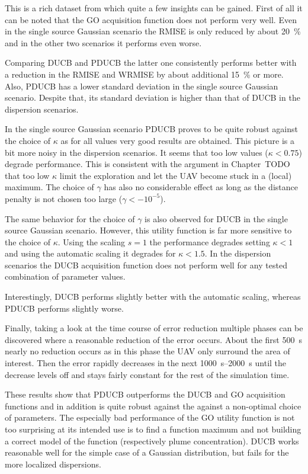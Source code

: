 \documentclass[11pt,a4paper,twoside,BCOR=15mm]{scrreprt}
\begin{document}
This is a rich dataset from which quite a few insights can be gained. First of 
all it can be noted that the GO acquisition function does not perform very well.  
Even in the single source Gaussian scenario the RMISE is only reduced by about 
\SI{20}{\percent} and in the other two scenarios it performs even worse.

Comparing DUCB and PDUCB the latter one consistently performs better with 
a reduction in the RMISE and WRMISE by about additional \SI{15}{\percent} or 
more. Also, PDUCB has a lower standard deviation in the single source Gaussian 
scenario. Despite that, its standard deviation is higher than that of DUCB in 
the dispersion scenarios.

In the single source Gaussian scenario PDUCB proves to be quite robust against 
the choice of $\kappa$ as for all values very good results are obtained. This 
picture is a bit more noisy in the dispersion scenarios. It seems that too low 
values ($\kappa < 0.75$) degrade performance. This is consistent with the 
argument in Chapter~TODO that too low $\kappa$ limit the exploration and let the 
UAV become stuck in a (local) maximum. The choice of $\gamma$ has also no 
considerable effect as long as the distance penalty is not chosen too large 
($\gamma < -10^{-5}$).

The same behavior for the choice of $\gamma$ is also observed for DUCB in the 
single source Gaussian scenario. However, this utility function is far more 
sensitive to the choice of $\kappa$. Using the scaling $s = 1$ the performance 
degrades setting $\kappa < 1$ and using the automatic scaling it degrades for 
$\kappa < 1.5$. In the dispersion scenarios the DUCB acquisition function does 
not perform well for any tested combination of parameter values.

Interestingly,  DUCB performs slightly better with the automatic scaling, 
whereas PDUCB performs slightly worse.

Finally, taking a look at the time course of error reduction multiple phases can 
be discovered where a reasonable reduction of the error occurs. About the first 
\SI{500}{\second} nearly no reduction occurs as in this phase the UAV only 
surround the area of interest. Then the error rapidly decreases in the next 
\SIrange{1000}{2000}{\second} until the decrease levels off and stays fairly 
constant for the rest of the simulation time.

These results show that PDUCB outperforms the DUCB and GO acquisition functions 
and in addition is quite robust against the against a non-optimal choice of 
parameters. The especially bad performance of the GO utility function is not too 
surprising at its intended use is to find a function maximum and not building 
a correct model of the function (respectively plume concentration).  DUCB works 
reasonable well for the simple case of a Gaussian distribution, but fails for 
the more localized dispersions.
\end{document}
